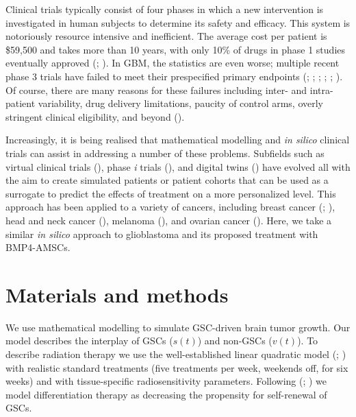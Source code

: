 \documentclass[
  letterpaper,
]{scrreprt}
\theoremstyle{definition}
\theoremstyle{remark}
\begin{document}
Clinical trials typically consist of four phases in which a new
intervention is investigated in human subjects to determine its safety
and efficacy. This system is notoriously resource intensive and
inefficient. The average cost per patient is \$59,500 and takes more
than 10 years, with only 10\% of drugs in phase 1 studies eventually
approved (;
). In GBM, the
statistics are even worse; multiple recent phase 3 trials have failed to
meet their prespecified primary endpoints
(;
;
;
;
;
). Of course, there are many
reasons for these failures including inter- and intra-patient
variability, drug delivery limitations, paucity of control arms, overly
stringent clinical eligibility, and beyond
().

Increasingly, it is being realised that mathematical modelling and
\emph{in silico} clinical trials can assist in addressing a number of
these problems. Subfields such as virtual clinical trials
(), phase \emph{i} trials
(), and digital twins
() have evolved all with the aim to
create simulated patients or patient cohorts that can be used as a
surrogate to predict the effects of treatment on a more personalized
level. This approach has been applied to a variety of cancers, including
breast cancer (;
), head and neck cancer
(), melanoma
(), and ovarian cancer
(). Here, we take a
similar \emph{in silico} approach to glioblastoma and its proposed
treatment with BMP4-AMSCs.

\section{Materials and methods}\label{sec-materials-methods}

We use mathematical modelling to simulate GSC-driven brain tumor growth.
Our model describes the interplay of GSCs (\(s(t)\)) and non-GSCs
(\(v(t)\)). To describe radiation therapy we use the well-established
linear quadratic model (; ) with realistic standard
treatments (five treatments per week, weekends off, for six weeks) and
with tissue-specific radiosensitivity parameters. Following
(;
) we model
differentiation therapy as decreasing the propensity for self-renewal of
GSCs.
\end{document}
